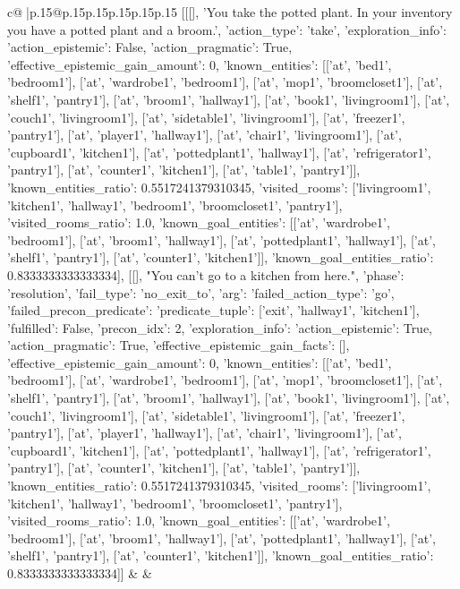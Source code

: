 \documentclass{article}
\begin{document}
{\begin{supertabular}{c@{$\;$}|p{.15\linewidth}@{}p{.15\linewidth}p{.15\linewidth}p{.15\linewidth}p{.15\linewidth}p{.15\linewidth}}
{{{	 [[[], 'You take the potted plant. In your inventory you have a potted plant and a broom.', {'action_type': 'take', 'exploration_info': {'action_epistemic': False, 'action_pragmatic': True, 'effective_epistemic_gain_amount': 0, 'known_entities': [['at', 'bed1', 'bedroom1'], ['at', 'wardrobe1', 'bedroom1'], ['at', 'mop1', 'broomcloset1'], ['at', 'shelf1', 'pantry1'], ['at', 'broom1', 'hallway1'], ['at', 'book1', 'livingroom1'], ['at', 'couch1', 'livingroom1'], ['at', 'sidetable1', 'livingroom1'], ['at', 'freezer1', 'pantry1'], ['at', 'player1', 'hallway1'], ['at', 'chair1', 'livingroom1'], ['at', 'cupboard1', 'kitchen1'], ['at', 'pottedplant1', 'hallway1'], ['at', 'refrigerator1', 'pantry1'], ['at', 'counter1', 'kitchen1'], ['at', 'table1', 'pantry1']], 'known_entities_ratio': 0.5517241379310345, 'visited_rooms': ['livingroom1', 'kitchen1', 'hallway1', 'bedroom1', 'broomcloset1', 'pantry1'], 'visited_rooms_ratio': 1.0, 'known_goal_entities': [['at', 'wardrobe1', 'bedroom1'], ['at', 'broom1', 'hallway1'], ['at', 'pottedplant1', 'hallway1'], ['at', 'shelf1', 'pantry1'], ['at', 'counter1', 'kitchen1']], 'known_goal_entities_ratio': 0.8333333333333334}}], [[], "You can't go to a kitchen from here.", {'phase': 'resolution', 'fail_type': 'no_exit_to', 'arg': {'failed_action_type': 'go', 'failed_precon_predicate': {'predicate_tuple': ['exit', 'hallway1', 'kitchen1'], 'fulfilled': False, 'precon_idx': 2}}, 'exploration_info': {'action_epistemic': True, 'action_pragmatic': True, 'effective_epistemic_gain_facts': [], 'effective_epistemic_gain_amount': 0, 'known_entities': [['at', 'bed1', 'bedroom1'], ['at', 'wardrobe1', 'bedroom1'], ['at', 'mop1', 'broomcloset1'], ['at', 'shelf1', 'pantry1'], ['at', 'broom1', 'hallway1'], ['at', 'book1', 'livingroom1'], ['at', 'couch1', 'livingroom1'], ['at', 'sidetable1', 'livingroom1'], ['at', 'freezer1', 'pantry1'], ['at', 'player1', 'hallway1'], ['at', 'chair1', 'livingroom1'], ['at', 'cupboard1', 'kitchen1'], ['at', 'pottedplant1', 'hallway1'], ['at', 'refrigerator1', 'pantry1'], ['at', 'counter1', 'kitchen1'], ['at', 'table1', 'pantry1']], 'known_entities_ratio': 0.5517241379310345, 'visited_rooms': ['livingroom1', 'kitchen1', 'hallway1', 'bedroom1', 'broomcloset1', 'pantry1'], 'visited_rooms_ratio': 1.0, 'known_goal_entities': [['at', 'wardrobe1', 'bedroom1'], ['at', 'broom1', 'hallway1'], ['at', 'pottedplant1', 'hallway1'], ['at', 'shelf1', 'pantry1'], ['at', 'counter1', 'kitchen1']], 'known_goal_entities_ratio': 0.8333333333333334}}]] 
	  } 
	   } 
	   } 
	 & & \\ 
 


\end{supertabular}}
\end{document}

